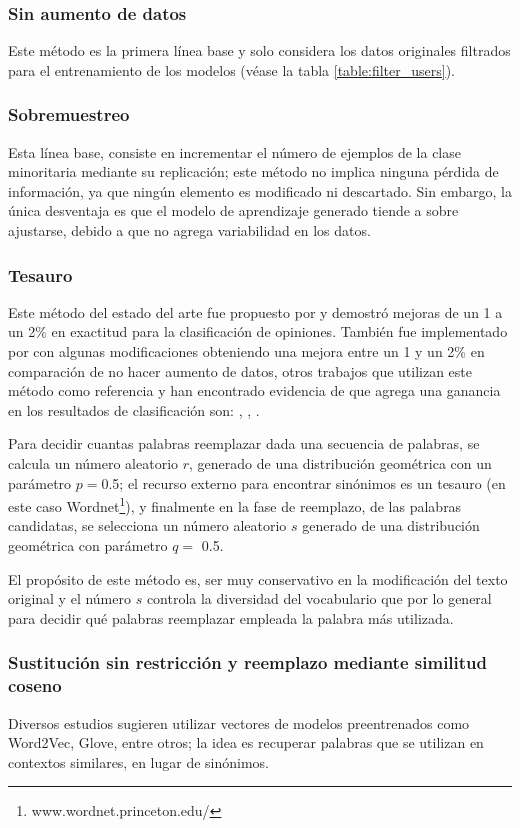 \subsubsection{Sin aumento de datos}
Este método es la primera línea base y solo considera los datos originales filtrados para el entrenamiento de los modelos (véase la tabla \ref{table:filter_users}).

\subsubsection{Sobremuestreo}
Esta línea base, consiste en incrementar el número de ejemplos de la clase minoritaria mediante su replicación; este método no implica ninguna pérdida de información, ya que ningún elemento es modificado ni descartado. Sin embargo, la única desventaja es que el modelo de aprendizaje generado tiende a sobre ajustarse, debido a que no agrega variabilidad en los datos.

\subsubsection{Tesauro}
Este método del estado del arte fue propuesto por \citep{zhang2015character} y demostró mejoras de un 1 a un 2\% en exactitud para la clasificación de opiniones. También fue implementado por \citep{wei2019eda} con algunas modificaciones obteniendo una mejora entre un 1 y un 2\% en comparación de no hacer aumento de datos, otros trabajos que utilizan este método como referencia y han encontrado evidencia de que agrega una ganancia en los resultados de clasificación son: \citep{jungiewicz2019towards}, \citep{kumar2019submodular}, \citep{park2019self}.

Para decidir cuantas palabras reemplazar dada una secuencia de palabras, se calcula un número aleatorio $r$, generado de una distribución geométrica con un parámetro $p=$0.5; el recurso externo para encontrar sinónimos es un tesauro (en este caso Wordnet\footnote{www.wordnet.princeton.edu/}), y finalmente en la fase de reemplazo, de las palabras candidatas, se selecciona un número aleatorio $s$ generado de una distribución geométrica con parámetro $q=$ 0.5.

El propósito de este método es, ser muy conservativo en la modificación del texto original y el número $s$ controla la diversidad del vocabulario que por lo general para decidir qué palabras reemplazar empleada la palabra más utilizada.

\subsubsection{Sustitución sin restricción y reemplazo mediante similitud coseno}
Diversos estudios sugieren utilizar vectores de modelos preentrenados como Word2Vec, Glove, entre otros; la idea es recuperar palabras que se utilizan en contextos similares, en lugar de sinónimos. 

